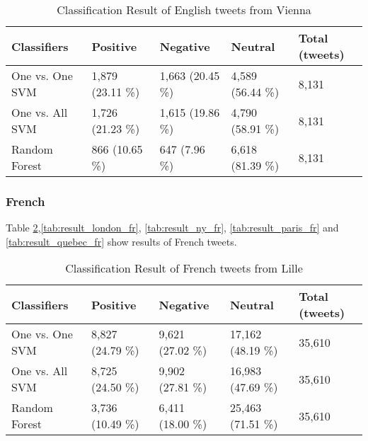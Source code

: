 \begin{table}[ht]
	\caption{Classification Result of English tweets from Vienna}
	\begin{tabular}{|l|p{1.8cm}|p{1.8cm}|p{1.8cm}|p{1.8cm}|} \hline
	Classifiers & Positive & Negative & Neutral & Total (tweets)\\ \hline
	
	One vs. One SVM & 1,879 (23.11 \%)& 1,663 (20.45 \%)& 4,589 (56.44 \%)& 8,131 \\ \hline
	One vs. All SVM & 1,726 (21.23 \%)& 1,615 (19.86 \%)& 4,790 (58.91 \%)& 8,131 \\ \hline
	Random Forest   & 866 \newline(10.65 \%) & 647 \newline(7.96 \%) & 6,618 (81.39 \%)& 8,131 \\ \hline
	\end{tabular}
	\label{tab:result_vienna_en}
\end{table}


\begin{comment}

\begin{table}[ht]
	\caption{Classification Result of Quebec}
	\begin{tabular}{|l|p{1.8cm}|p{1.8cm}|p{1.8cm}|p{1.8cm}|} \hline
	Classifiers & Positive & Negative & Neutral & Total (tweets)\\ \hline
	( \%)
	\end{tabular}
	\label{tab:result_quebec_en}
\end{table}


\end{comment}
\clearpage
\subsubsection{French}
Table \ref{tab:result_lille_fr},\ref{tab:result_london_fr}, \ref{tab:result_ny_fr}, \ref{tab:result_paris_fr} and \ref{tab:result_quebec_fr} show results of French tweets.

\begin{table}[ht]
	\caption{Classification Result of French tweets from Lille}
	\begin{tabular}{|l|p{1.8cm}|p{1.8cm}|p{1.8cm}|p{1.8cm}|} \hline
	Classifiers & Positive & Negative & Neutral & Total (tweets)\\ \hline
	
	One vs. One SVM & 8,827 (24.79 \%)& 9,621 (27.02 \%)& 17,162 (48.19 \%)& 35,610 \\ \hline
	One vs. All SVM & 8,725 (24.50 \%)& 9,902 (27.81 \%)& 16,983 (47.69 \%)& 35,610 \\ \hline
	Random Forest   & 3,736 (10.49 \%)& 6,411 (18.00 \%)& 25,463 (71.51 \%)& 35,610 \\ \hline
	\end{tabular}
	\label{tab:result_lille_fr}
\end{table}



